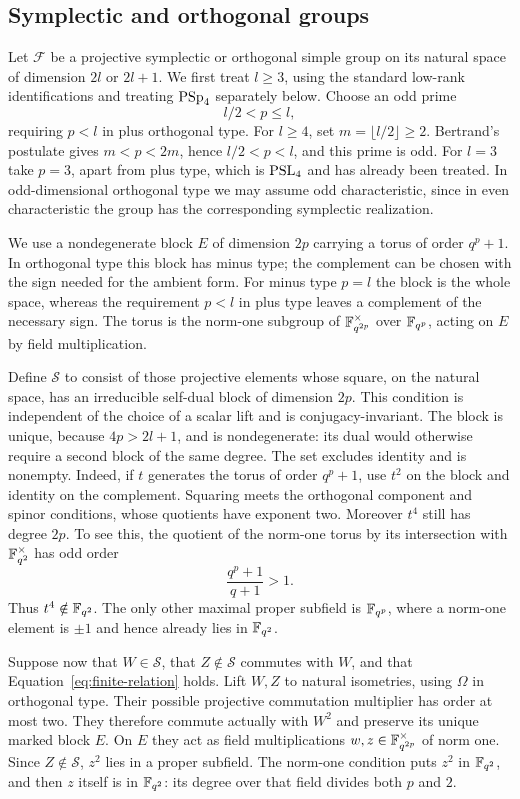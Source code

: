 \subsection{Symplectic and orthogonal groups}

Let $\mathcal F$ be a projective symplectic or orthogonal simple group
on its natural space of dimension $2l$ or $2l+1$. We first treat
$l\ge3$, using the standard low-rank identifications and treating
$\operatorname{PSp}_4$ separately below. Choose an odd prime
\begin{equation}\label{eq:finite-block-prime}
 l/2<p\le l,
\end{equation}
requiring $p<l$ in plus orthogonal type. For $l\ge4$, set
$m=\lfloor l/2\rfloor\ge2$. Bertrand's postulate gives
$m<p<2m$, hence $l/2<p<l$, and this prime is odd.
For $l=3$ take $p=3$, apart from plus type, which is $\operatorname{PSL}_4$ and
has already been treated. In odd-dimensional orthogonal type we may
assume odd characteristic, since in even characteristic the group
has the corresponding symplectic realization.

We use a nondegenerate block $E$ of dimension $2p$ carrying a torus
of order $q^p+1$. In orthogonal type this block has minus type; the
complement can be chosen with the sign needed for the ambient form.
For minus type $p=l$ the block is the whole space, whereas the
requirement $p<l$ in plus type leaves a complement of the necessary
sign. The torus is the norm-one subgroup of
$\mathbb F_{q^{2p}}^\times$ over $\mathbb F_{q^p}$, acting on $E$ by field
multiplication.

Define $\mathcal S$ to consist of those projective elements whose
square, on the natural space, has an irreducible self-dual block of
dimension $2p$. This condition is independent of the choice of a
scalar lift and is conjugacy-invariant. The block is unique, because
$4p>2l+1$, and is nondegenerate: its dual would otherwise require a
second block of the same degree. The set excludes identity and is
nonempty. Indeed, if $t$ generates the torus of order $q^p+1$, use
$t^2$ on the block and identity on the complement. Squaring meets
the orthogonal component and spinor conditions, whose quotients
have exponent two. Moreover $t^4$ still has degree $2p$. To see
this, the quotient of the norm-one torus by its intersection with
$\mathbb F_{q^2}^{\times}$ has odd order
\[
 \frac{q^p+1}{q+1}>1.
\]
Thus $t^4\notin\mathbb F_{q^2}$. The only other maximal proper subfield
is $\mathbb F_{q^p}$, where a norm-one element is $\pm1$ and hence already
lies in $\mathbb F_{q^2}$.

Suppose now that $W\in\mathcal S$, that $Z\notin\mathcal S$
commutes with $W$, and that Equation~\eqref{eq:finite-relation} holds.
Lift $W,Z$ to natural isometries, using $\Omega$ in orthogonal type.
Their possible projective commutation multiplier has order at most
two. They therefore commute actually with $W^2$ and preserve its
unique marked block $E$. On $E$ they act as field multiplications
$w,z\in\mathbb F_{q^{2p}}^\times$ of norm one. Since $Z\notin\mathcal S$,
$z^2$ lies in a proper subfield. The norm-one condition puts $z^2$
in $\mathbb F_{q^2}$, and then $z$ itself is in $\mathbb F_{q^2}$: its degree
over that field divides both $p$ and $2$.

